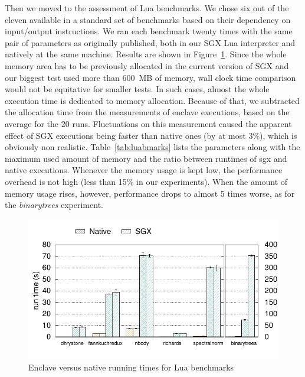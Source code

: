 Then we moved to the assessment of Lua benchmarks.
We chose six out of the eleven available in a standard set of benchmarks \cite{bolz2015} based on their dependency on input/output instructions.
We ran each benchmark twenty times with the same pair of parameters as originally published, both in our SGX Lua interpreter and natively at the same machine.
Results are shown in Figure~\ref{fig:luabenchs}.
Since the whole memory area has to be previously allocated in the current version of SGX and our biggest test used more than 600~MB of memory, wall clock time comparison would not be equitative for smaller tests.
In such cases, almost the whole execution time is dedicated to memory allocation.
Because of that, we subtracted the allocation time from the measurements of enclave executions, based on the average for the 20 runs.
Fluctuations on this measurement caused the apparent effect of SGX executions being faster than native ones (by at most 3\%), which is obviously non realistic.
Table~\ref{tab:luabmarks} lists the parameters along with the maximum used amount of memory and the ratio between runtimes of sgx and native executions.
Whenever the memory usage is kept low, the performance overhead is not high (less than 15\% in our experiments). When the amount of memory usage rises, however, performance drops to almost 5 times worse, as for the \emph{binarytrees} experiment.

\begin{figure}[b!]
  \centering
  \includegraphics[scale=0.65]{plots/microbenchmark_luasgx/microbenchmark_luasgx.pdf}
  \caption{Enclave versus native running times for Lua benchmarks}
  \label{fig:luabenchs}
\end{figure}

